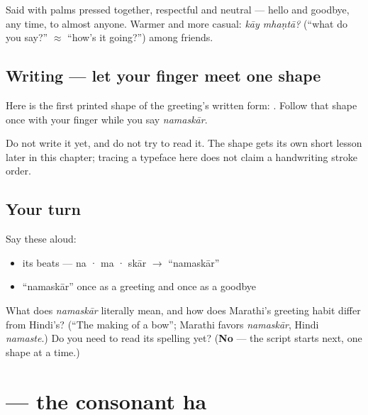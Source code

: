 \begin{culture}
Said with palms pressed together, respectful and neutral — hello and goodbye, any time, to almost anyone. Warmer and more casual: \emph{kāy mhaṇtā?} (\textquotedblleft{}what do you say?\textquotedblright{} $\approx$ \textquotedblleft{}how's it going?\textquotedblright{}) among friends.
\end{culture}

\subsection*{Writing — let your finger meet one shape}
Here is the first printed shape of the greeting's written form: \textbf{}. Follow that shape once with your finger while you say \emph{namaskār}.

Do not write it yet, and do not try to read it. The shape gets its own short lesson later in this chapter; tracing a typeface here does not claim a handwriting stroke order.

\subsection*{Your turn}
Say these aloud:

\begin{itemize}
\raggedright
  \item its beats — na · ma · skār $\to$ \textquotedblleft{}namaskār\textquotedblright{}
  \item \textquotedblleft{}namaskār\textquotedblright{} once as a greeting and once as a goodbye
\end{itemize}

\begin{tcolorbox}[breakable,colback=teal!4,colframe=teal!35!black,title={Before you move on}]
What does \emph{namaskār} literally mean, and how does Marathi's greeting habit differ from Hindi's? (\textquotedblleft{}The making of a bow\textquotedblright{}; Marathi favors \emph{namaskār}, Hindi \emph{namaste}.) Do you need to read its spelling yet? (\textbf{No} — the script starts next, one shape at a time.)
\end{tcolorbox}
\section[\texorpdfstring{\mr{ह} (ha)}{ह (ha)}]{ — the consonant ha}

\label{lesson:MR-W01-ha}



